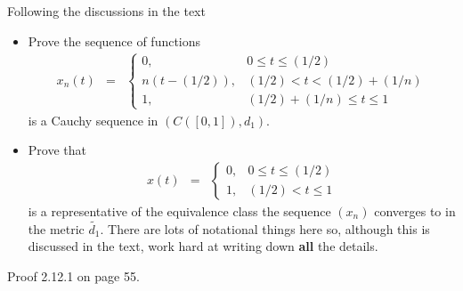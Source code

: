 \documentclass[11pt]{SelfArxOneColBMN}
\begin{document}
\begin{exercise}
Following the discussions in the text
\begin{itemize}
\item Prove the sequence of functions
\begin{eqnarray*}
x_n(t) &=&
\left \{
\begin{array}{ll}
0, & 0 \leq t \leq (1/2)\\
n(t - (1/2)), & (1/2) < t < (1/2) + (1/n)\\
1, & (1/2) + (1/n) \leq t \leq 1
\end{array}
\right .
\end{eqnarray*}
\noindent
is a Cauchy sequence in $(C([0,1]), d_1)$.
\item Prove that
\begin{eqnarray*}
x(t) &=&
\left \{
\begin{array}{ll}
0, & 0 \leq t \leq (1/2)\\
1, & (1/2)  < t \leq 1
\end{array}
\right .
\end{eqnarray*}
\noindent
is a representative of the equivalence class the
sequence $(x_n)$ converges to in the
metric $\widetilde{d_1}$.  There are lots of
notational things here so, although this is discussed
in the text, work hard at writing down {\bf all} the
details.
\end{itemize}
\end{exercise}

\begin{solution}
Proof 2.12.1 on page 55.
\end{solution}
	
\end{document}
